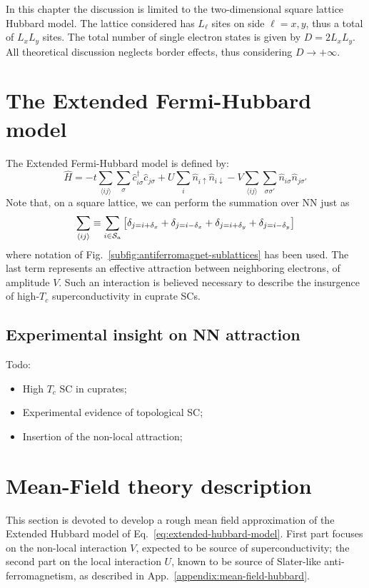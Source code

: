 In this chapter the discussion is limited to the two-dimensional square lattice Hubbard model. The lattice considered has $L_\ell$ sites on side $\ell = x,y$, thus a total of $L_x L_y$ sites. The total number of single electron states is given by $D = 2L_x L_y$. All theoretical discussion neglects border effects, thus considering $D \to +\infty$.

\section{The Extended Fermi-Hubbard model}

The Extended Fermi-Hubbard model is defined by:
\begin{equation}\label{eq:extended-hubbard-model}
	\hat H =
	-t \sum_{\langle ij \rangle} \sum_\sigma \hat c_{i\sigma}^\dagger \hat c_{j\sigma}
	+ U \sum_i \hat n_{i\uparrow} \hat n_{i\downarrow}
	- V \sum_{\langle ij \rangle} \sum_{\sigma \sigma'} \hat n_{i\sigma} \hat n_{j\sigma'}
\end{equation}
Note that, on a square lattice, we can perform the summation over NN just as
\[
	\sum_{\ev{ij}} \equiv \sum_{i \in \mathcal{S}_a} \left[
		\delta_{j=i+\delta_x} + \delta_{j=i-\delta_x} + \delta_{j=i+\delta_y} + \delta_{j=i-\delta_y}
	\right]
\]
where notation of Fig.~\ref{subfig:antiferromagnet-sublattices} has been used. The last term represents an effective attraction between neighboring electrons, of amplitude $V$. Such an interaction is believed \cite{cao2025p-wave} necessary to describe the insurgence of high-$T_c$ superconductivity in cuprate SCs. \todo

\subsection{Experimental insight on NN attraction}

{\color{tabred}Todo:
\begin{itemize}
	\item High $T_c$ SC in cuprates;
	\item Experimental evidence of topological SC;
	\item Insertion of the non-local attraction;
\end{itemize}}

\section{Mean-Field theory description}

This section is devoted to develop a rough mean field approximation of the Extended Hubbard model of Eq.~\eqref{eq:extended-hubbard-model}. First part focuses on the non-local interaction $V$, expected to be source of superconductivity; the second part on the local interaction $U$, known to be source of Slater-like anti-ferromagnetism, as described in App.~\ref{appendix:mean-field-hubbard}.

